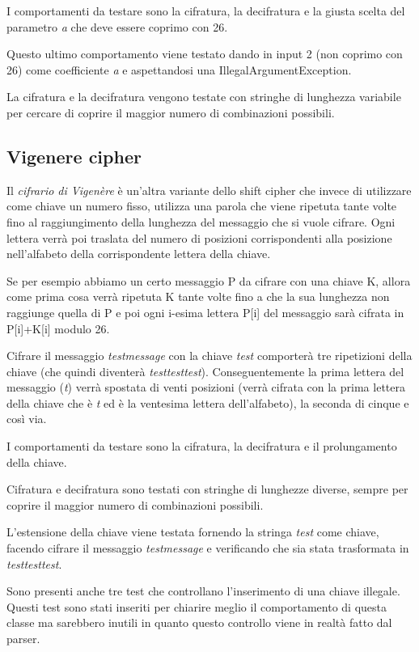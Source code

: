 			I comportamenti da testare sono la cifratura, la decifratura e la giusta scelta del  parametro \emph{a} che deve essere coprimo con 26.
			
			Questo ultimo comportamento viene testato dando in input 2 (non coprimo con 26) come coefficiente \emph{a} e aspettandosi una IllegalArgumentException.
			
			La cifratura e la decifratura vengono testate con stringhe di lunghezza variabile per cercare di coprire il maggior numero di combinazioni possibili.
			
		\subsection{Vigenere cipher}
			Il \emph{cifrario di Vigenère} è un'altra variante dello shift cipher che invece di utilizzare come chiave un numero fisso, utilizza una parola che viene ripetuta tante volte fino al raggiungimento della lunghezza del messaggio che si vuole cifrare. Ogni lettera verrà poi traslata del numero di posizioni corrispondenti alla posizione nell'alfabeto della corrispondente lettera della chiave.
			
			Se per esempio abbiamo un certo messaggio P da cifrare con una chiave K, allora come prima cosa verrà ripetuta K tante volte fino a che la sua lunghezza non raggiunge quella di P e poi ogni i-esima lettera P[i] del messaggio sarà cifrata in P[i]+K[i] modulo 26.
			
			Cifrare il messaggio \emph{testmessage} con la chiave \emph{test} comporterà tre ripetizioni della chiave (che quindi diventerà \emph{testtesttest}). Conseguentemente la prima lettera del messaggio (\emph{t}) verrà spostata di venti posizioni (verrà cifrata con la prima lettera della chiave che è \emph{t} ed è la ventesima lettera dell'alfabeto), la seconda di cinque e così via.
			
			I comportamenti da testare sono la cifratura, la decifratura e il prolungamento della chiave.
			
			Cifratura e decifratura sono testati con stringhe di lunghezze diverse, sempre per coprire il maggior numero di combinazioni possibili.
			
			L'estensione della chiave viene testata fornendo la stringa \emph{test} come chiave, facendo cifrare il messaggio \emph{testmessage} e verificando che sia stata trasformata in \emph{testtesttest}.
			
			Sono presenti anche tre test che controllano l'inserimento di una chiave illegale. Questi test sono stati inseriti per chiarire meglio il comportamento di questa classe ma sarebbero inutili in quanto questo controllo viene in realtà fatto dal parser.
			

